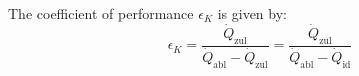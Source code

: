 The coefficient of performance \( \epsilon_K \) is given by:  
\[
\epsilon_K = \frac{\dot{Q}_{\text{zul}}}{\dot{Q}_{\text{abl}} - \dot{Q}_{\text{zul}}} = \frac{\dot{Q}_{\text{zul}}}{\dot{Q}_{\text{abl}} - \dot{Q}_{\text{id}}}
\]